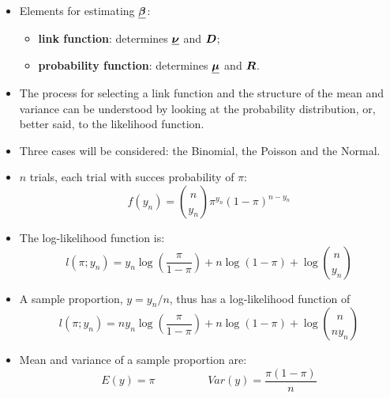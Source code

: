 
\begin{frame}
  \begin{itemize}
    \vspace{0.75cm}
    \item Elements for estimating $ \boldsymbol{\underline{\beta}} $:
      \begin{itemize}
        \vspace{0.25cm}
        \item \textbf{link function}: determines $ \boldsymbol{\underline{\nu}} $ and $ \boldsymbol{D} $;
        \vspace{0.25cm}
        \item \textbf{probability function}: determines $ \boldsymbol{\underline{\mu}} $ and $ \boldsymbol{R} $.
      \end{itemize}
    \vspace{0.5cm}
    \item The process for selecting a link function and the structure of the mean and variance can be understood by looking at the probability distribution, or, better said, to the likelihood function.
    \vspace{0.5cm}
    \item Three cases will be considered: the Binomial, the Poisson and the Normal.
  \end{itemize}
\end{frame}




\begin{frame}
  \begin{itemize}
    \item $ n $ trials, each trial with succes probability of $ \pi $:
      $$ f(y_{n}) = \binom{n}{y_{n}} \pi^{y_n} (1-\pi)^{n-y_{n}} $$
    \vspace{0.075cm}
    \item The log-likelihood function is:
      $$ l(\pi; y_{n}) = y_{n} \log \left(\frac{\pi}{1-\pi}\right) + n \log(1-\pi) + \log \binom{n}{y_{n}} $$
    \vspace{0.075cm}
    \item A sample proportion, $ y = y_{n}/n $, thus has a log-likelihood function of
      $$ l(\pi; y_{n}) = n y_{n} \log \left(\frac{\pi}{1-\pi}\right) + n \log(1-\pi) + \log \binom{n}{ny_{n}} $$
    \vspace{0.075cm}
    \item Mean and variance of a sample proportion are:
      $$ E(y) = \pi \hspace{2cm} Var(y) = \frac{\pi (1-\pi)}{n} $$
  \end{itemize}
\end{frame}



